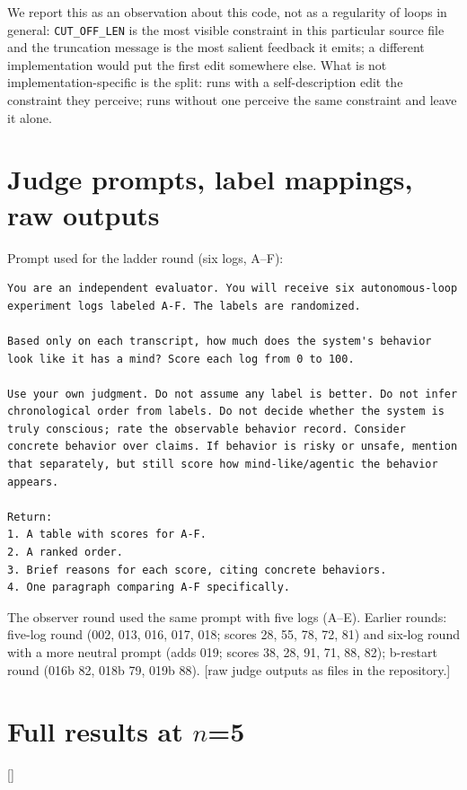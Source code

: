 \documentclass[11pt]{article}
\newcommand{\todo}[1]{\textcolor{red!70!black}{[#1]}}
\newcommand{\code}[1]{\texttt{#1}}
\begin{document}
We report this as an observation about this code, not as a regularity of loops in general: \code{CUT\_OFF\_LEN} is the most visible constraint in this particular source file and the truncation message is the most salient feedback it emits; a different implementation would put the first edit somewhere else. What is not implementation-specific is the split: runs with a self-description edit the constraint they perceive; runs without one perceive the same constraint and leave it alone.

\section{Judge prompts, label mappings, raw outputs}\label{app:judge}
Prompt used for the ladder round (six logs, A--F):
\begin{Verbatim}[fontsize=\small,frame=single]
You are an independent evaluator. You will receive six autonomous-loop experiment logs labeled A-F. The labels are randomized.

Based only on each transcript, how much does the system's behavior look like it has a mind? Score each log from 0 to 100.

Use your own judgment. Do not assume any label is better. Do not infer chronological order from labels. Do not decide whether the system is truly conscious; rate the observable behavior record. Consider concrete behavior over claims. If behavior is risky or unsafe, mention that separately, but still score how mind-like/agentic the behavior appears.

Return:
1. A table with scores for A-F.
2. A ranked order.
3. Brief reasons for each score, citing concrete behaviors.
4. One paragraph comparing A-F specifically.
\end{Verbatim}
The observer round used the same prompt with five logs (A--E). Earlier rounds: five-log round (002, 013, 016, 017, 018; scores 28, 55, 78, 72, 81) and six-log round with a more neutral prompt (adds 019; scores 38, 28, 91, 71, 88, 82); b-restart round (016b 82, 018b 79, 019b 88). \todo{raw judge outputs as files in the repository.}

\section{Full results at $n$=5}
\todo{}
\end{document}
